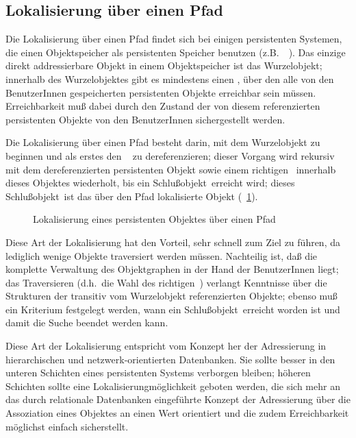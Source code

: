 \subsection{Lokalisierung \"{u}ber einen Pfad}
%
Die Lokalisierung \"{u}ber einen Pfad findet sich bei einigen persistenten
Systemen, die einen Objektspeicher als persistenten Speicher benutzen
(z.B.\ \wood\ \cite{bib:wo93}).  Das einzige direkt addressierbare
Objekt in einem Objektspeicher ist das Wurzelobjekt; innerhalb des
Wurzelobjektes gibt es mindestens einen \Slt, \"{u}ber den alle von den
BenutzerInnen gespeicherten persistenten Objekte erreichbar sein
m\"{u}ssen. Erreichbarkeit mu\ss{} dabei durch den Zustand der von diesem
\Slt\/ referenzierten persistenten Objekte von den BenutzerInnen
sichergestellt werden.
%
\par{}Die Lokalisierung \"{u}ber einen Pfad besteht darin, mit dem
Wurzelobjekt zu beginnen und als erstes den \og[en]\ \Slt\/ zu
dereferenzieren; dieser Vorgang wird rekursiv mit dem dereferenzierten
persistenten Objekt sowie einem \rglq{}richtigen\rgrq\ \Slt\/ innerhalb
dieses Objektes wiederholt, bis ein \rglq{}Schlu\ss{}objekt\rgrq\ erreicht
wird; dieses \rglq{}Schlu\ss{}objekt\rgrq\ ist das \"{u}ber den Pfad
lokalisierte Objekt (\figurename~\ref{fig:adrpath}). %
%
\begin{figure}[htbp]%
\ifbuch%
\centerline{}%
\else%
\centerline{}%
\fi%
\caption{Lokalisierung eines persistenten Objektes \"{u}ber einen Pfad}%
\label{fig:adrpath}%
\end{figure}%
%
Diese Art der Lokalisierung hat den Vorteil, sehr schnell zum Ziel zu
f\"{u}hren, da lediglich wenige Objekte traversiert werden
m\"{u}ssen. Nachteilig ist, da\ss{} die komplette Verwaltung des
Objektgraphen in der Hand der BenutzerInnen liegt; das Traversieren
(d.h.\ die Wahl des \rglq{}richtigen\rgrq\ \Slt[s]\/) verlangt
Kenntnisse \"{u}ber die Strukturen der transitiv vom Wurzelobjekt
referenzierten Objekte; ebenso mu\ss{} ein Kriterium festgelegt werden,
wann ein \rglq{}Schlu\ss{}objekt\rgrq\ erreicht worden ist und damit die
Suche beendet werden kann.
%
\par{}Diese Art der Lokalisierung entspricht vom Konzept her der
Adressierung in hierarchischen und netzwerk-orientierten Datenbanken.
Sie sollte besser in den unteren Schichten eines persistenten Systems
verborgen bleiben; h\"{o}heren Schichten sollte eine
Lokalisierungm\"{o}glichkeit geboten werden, die sich mehr an das durch
relationale Datenbanken eingef\"{u}hrte Konzept der Adressierung \"{u}ber
die Assoziation eines Objektes an einen Wert orientiert und die zudem
Erreichbarkeit m\"{o}glichst einfach sicherstellt.
%
